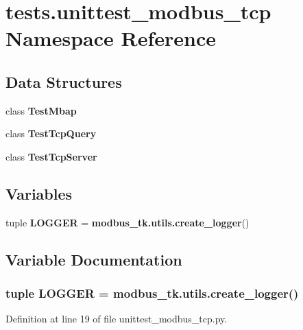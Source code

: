 \section{tests.\+unittest\+\_\+modbus\+\_\+tcp Namespace Reference}
\label{namespacetests_1_1unittest__modbus__tcp}
\subsection*{Data Structures}
\begin{DoxyCompactItemize}
\item 
class {\bf Test\+Mbap}
\item 
class {\bf Test\+Tcp\+Query}
\item 
class {\bf Test\+Tcp\+Server}
\end{DoxyCompactItemize}
\subsection*{Variables}
\begin{DoxyCompactItemize}
\item 
tuple {\bf L\+O\+G\+G\+E\+R} = {\bf modbus\+\_\+tk.\+utils.\+create\+\_\+logger}()
\end{DoxyCompactItemize}


\subsection{Variable Documentation}
\subsubsection[{L\+O\+G\+G\+E\+R}]{\setlength{\rightskip}{0pt plus 5cm}tuple L\+O\+G\+G\+E\+R = {\bf modbus\+\_\+tk.\+utils.\+create\+\_\+logger}()}\label{namespacetests_1_1unittest__modbus__tcp_ae9c29667350ae00a0837fc1e77c279e2}


Definition at line 19 of file unittest\+\_\+modbus\+\_\+tcp.\+py.

